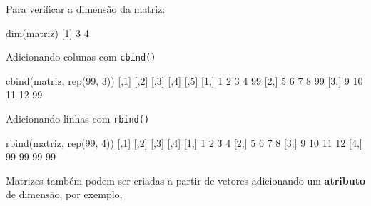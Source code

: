 \documentclass[
  10pt,
  a4paper]{book}
\newenvironment{Shaded}{\begin{snugshade}}{\end{snugshade}}
\newcommand{\DecValTok}[1]{\textcolor[rgb]{0.00,0.00,0.81}{#1}}
\newcommand{\FunctionTok}[1]{\textcolor[rgb]{0.00,0.00,0.00}{#1}}
\newcommand{\NormalTok}[1]{#1}
\begin{document}
Para verificar a dimensão da matriz:

\begin{Shaded}
\begin{Highlighting}[]
\FunctionTok{dim}\NormalTok{(matriz)}
\NormalTok{[}\DecValTok{1}\NormalTok{] }\DecValTok{3} \DecValTok{4}
\end{Highlighting}
\end{Shaded}

Adicionando colunas com \texttt{cbind()}

\begin{Shaded}
\begin{Highlighting}[]
\FunctionTok{cbind}\NormalTok{(matriz, }\FunctionTok{rep}\NormalTok{(}\DecValTok{99}\NormalTok{, }\DecValTok{3}\NormalTok{))}
\NormalTok{     [,}\DecValTok{1}\NormalTok{] [,}\DecValTok{2}\NormalTok{] [,}\DecValTok{3}\NormalTok{] [,}\DecValTok{4}\NormalTok{] [,}\DecValTok{5}\NormalTok{]}
\NormalTok{[}\DecValTok{1}\NormalTok{,]    }\DecValTok{1}    \DecValTok{2}    \DecValTok{3}    \DecValTok{4}   \DecValTok{99}
\NormalTok{[}\DecValTok{2}\NormalTok{,]    }\DecValTok{5}    \DecValTok{6}    \DecValTok{7}    \DecValTok{8}   \DecValTok{99}
\NormalTok{[}\DecValTok{3}\NormalTok{,]    }\DecValTok{9}   \DecValTok{10}   \DecValTok{11}   \DecValTok{12}   \DecValTok{99}
\end{Highlighting}
\end{Shaded}

Adicionando linhas com \texttt{rbind()}

\begin{Shaded}
\begin{Highlighting}[]
\FunctionTok{rbind}\NormalTok{(matriz, }\FunctionTok{rep}\NormalTok{(}\DecValTok{99}\NormalTok{, }\DecValTok{4}\NormalTok{))}
\NormalTok{     [,}\DecValTok{1}\NormalTok{] [,}\DecValTok{2}\NormalTok{] [,}\DecValTok{3}\NormalTok{] [,}\DecValTok{4}\NormalTok{]}
\NormalTok{[}\DecValTok{1}\NormalTok{,]    }\DecValTok{1}    \DecValTok{2}    \DecValTok{3}    \DecValTok{4}
\NormalTok{[}\DecValTok{2}\NormalTok{,]    }\DecValTok{5}    \DecValTok{6}    \DecValTok{7}    \DecValTok{8}
\NormalTok{[}\DecValTok{3}\NormalTok{,]    }\DecValTok{9}   \DecValTok{10}   \DecValTok{11}   \DecValTok{12}
\NormalTok{[}\DecValTok{4}\NormalTok{,]   }\DecValTok{99}   \DecValTok{99}   \DecValTok{99}   \DecValTok{99}
\end{Highlighting}
\end{Shaded}

Matrizes também podem ser criadas a partir de vetores adicionando um
\textbf{atributo} de dimensão, por exemplo,
\end{document}
